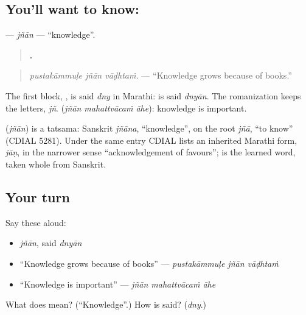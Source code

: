 \subsection*{You'll want to know: }
\textbf{} — \emph{jñān} — \textquotedblleft{}knowledge\textquotedblright{}.

\begin{quote}
\textbf{  .}
\end{quote}

\begin{quote}
\emph{pustakāmmuḷe jñān vāḍhtaṁ.} — \textquotedblleft{}Knowledge grows because of books.\textquotedblright{}
\end{quote}

The first block, \textbf{}, is said \emph{dny} in Marathi: \textbf{} is said \emph{dnyān}. The romanization keeps the letters, \emph{jñ}. \textbf{  } (\emph{jñān mahattvācaṁ āhe}): knowledge is important.

\begin{cousinweb}
\textbf{} (\emph{jñān}) is a tatsama: Sanskrit \emph{jñāna}, \textquotedblleft{}knowledge\textquotedblright{}, on the root \emph{jñā}, \textquotedblleft{}to know\textquotedblright{} (CDIAL 5281). Under the same entry CDIAL lists an inherited Marathi form, \emph{jāṇ}, in the narrower sense \textquotedblleft{}acknowledgement of favours\textquotedblright{}; \textbf{} is the learned word, taken whole from Sanskrit.
\end{cousinweb}

\subsection*{Your turn}
Say these aloud:

\begin{itemize}
\raggedright
  \item \emph{jñān}, said \emph{dnyān}
  \item \textquotedblleft{}Knowledge grows because of books\textquotedblright{} — \emph{pustakāmmuḷe jñān vāḍhtaṁ}
  \item \textquotedblleft{}Knowledge is important\textquotedblright{} — \emph{jñān mahattvācaṁ āhe}
\end{itemize}

\begin{tcolorbox}[breakable,colback=teal!4,colframe=teal!35!black,title={Before you move on}]
What does \textbf{} mean? (\textquotedblleft{}Knowledge\textquotedblright{}.) How is \textbf{} said? (\emph{dny}.)
\end{tcolorbox}
